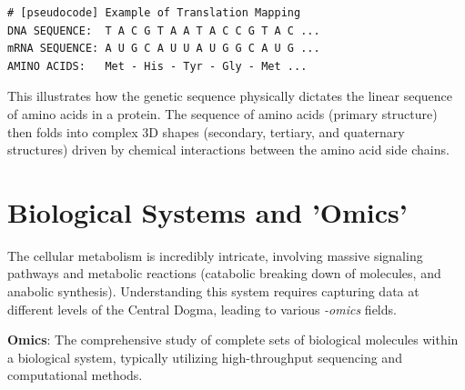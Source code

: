 


\begin{verbatim}
# [pseudocode] Example of Translation Mapping
DNA SEQUENCE:  T A C G T A A T A C C G T A C ...
mRNA SEQUENCE: A U G C A U U A U G G C A U G ...
AMINO ACIDS:   Met - His - Tyr - Gly - Met ...
\end{verbatim}

This illustrates how the genetic sequence physically dictates the linear sequence of amino acids in a protein. The sequence of amino acids (primary structure) then folds into complex 3D shapes (secondary, tertiary, and quaternary structures) driven by chemical interactions between the amino acid side chains.

\section{Biological Systems and 'Omics'}

The cellular metabolism is incredibly intricate, involving massive signaling pathways and metabolic reactions (catabolic breaking down of molecules, and anabolic synthesis). Understanding this system requires capturing data at different levels of the Central Dogma, leading to various \textit{-omics} fields.

\begin{important}
  \textbf{Omics}: The comprehensive study of complete sets of biological molecules within a biological system, typically utilizing high-throughput sequencing and computational methods.
\end{important}

